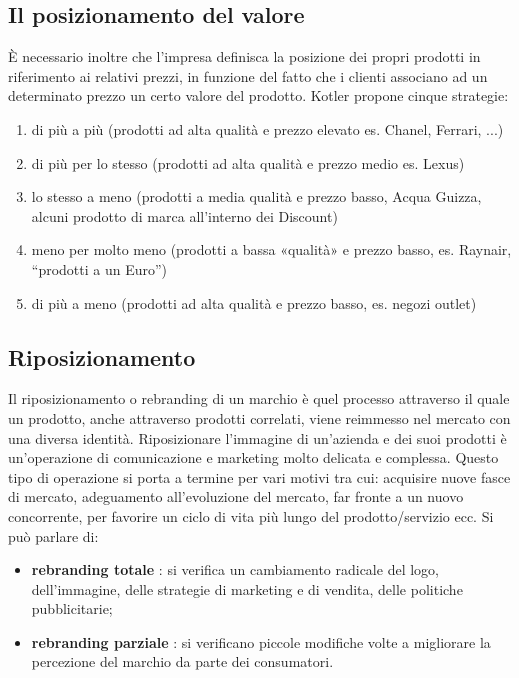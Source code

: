 \subsection{Il posizionamento del valore}
È necessario inoltre che l’impresa definisca la posizione dei propri prodotti in riferimento ai relativi prezzi, in funzione del fatto che i clienti associano ad un determinato prezzo un certo valore del prodotto. \newline
Kotler propone cinque strategie:
\begin{enumerate}
	\item di più a più (prodotti ad alta qualità e prezzo elevato es. Chanel, Ferrari, ...)
	\item di più per lo stesso (prodotti ad alta qualità e prezzo medio es. Lexus)
	\item lo stesso a meno (prodotti a media qualità e prezzo basso, Acqua Guizza, alcuni prodotto di marca all’interno dei Discount)
	\item meno per molto meno (prodotti a bassa «qualità» e prezzo basso, es. Raynair, “prodotti a un Euro”)
	\item di più a meno (prodotti ad alta qualità e prezzo
	basso, es. negozi outlet)
\end{enumerate}

\subsection{Riposizionamento}
Il riposizionamento o rebranding di un marchio è quel processo attraverso il quale un prodotto, anche attraverso prodotti correlati, viene reimmesso nel mercato con una diversa identità. \newline
Riposizionare l’immagine di un’azienda e dei suoi prodotti è un’operazione di comunicazione e marketing molto delicata e complessa. Questo tipo di operazione si porta a termine per vari motivi tra cui: acquisire nuove fasce di mercato, adeguamento all'evoluzione del mercato, far fronte a un nuovo concorrente, per favorire un ciclo di vita più lungo del prodotto/servizio ecc. \newline
Si può parlare di:
\begin{itemize}
\item \textbf{rebranding totale} : si verifica un cambiamento radicale del logo, dell'immagine, delle strategie di marketing e di vendita, delle politiche pubblicitarie;
\item \textbf{rebranding parziale} : si verificano piccole modifiche volte a migliorare la percezione del marchio da parte dei consumatori.
\end{itemize}

